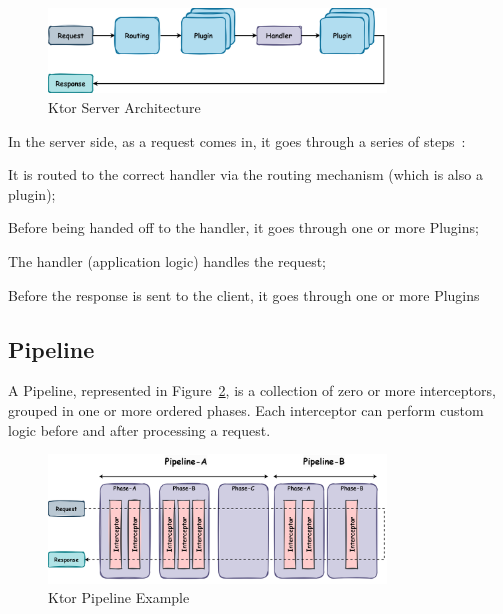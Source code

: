 \begin{figure}[!htb]
    \centering
    \includegraphics[width=0.8\textwidth]{../figures/03_ktor-server-architecture}
    \caption{Ktor Server Architecture}
    \label{fig:ktor-server-architecture}
\end{figure}

In the server side, as a request comes in, it goes through a series of steps~\cite{ktor-server-plugins}:

\begin{boldenumerate}
    \item It is routed to the correct handler via the routing mechanism (which is also a plugin);
    \item Before being handed off to the handler, it goes through one or more Plugins;
    \item The handler (application logic) handles the request;
    \item Before the response is sent to the client, it goes through one or more Plugins
\end{boldenumerate}

\subsection{Pipeline}\label{subsec:pipeline}

A Pipeline, represented in Figure~\ref{fig:ktor-pipeline}, is a collection of zero or more interceptors, grouped in one or more ordered phases.
Each interceptor can perform custom logic before and after processing a request.

\begin{figure}[!htb]
    \centering
    \includegraphics[width=0.8\textwidth]{../figures/03_ktor-pipeline}
    \caption{Ktor Pipeline Example}
    \label{fig:ktor-pipeline}
\end{figure}

